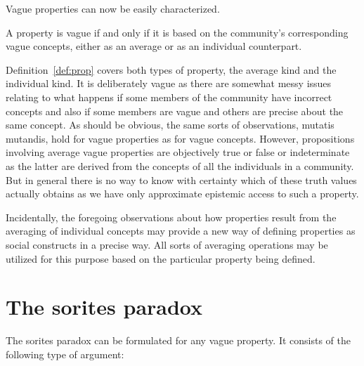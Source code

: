 
Vague properties can now be easily characterized.


\begin{definition}
A property is vague if and only if it is based on the community's corresponding vague concepts, either as an average or as an individual counterpart.
\label{def:prop}
\end{definition}

Definition~\ref{def:prop} covers both types of property, the average kind and the individual kind. It is deliberately vague as there are somewhat messy issues relating to what happens if some members of the community have incorrect concepts and also if some members are vague and others are precise about the same concept. As should be obvious, the same sorts of observations, mutatis mutandis, hold for vague properties as for vague concepts. However, propositions involving average vague properties are objectively true or false or indeterminate as the latter are derived from the concepts of all the individuals in a community. But in general there is no way to know with certainty which of these truth values actually obtains as we have only approximate epistemic access to such a property.

Incidentally, the foregoing observations about how properties result from the averaging of individual concepts may provide a new way of defining properties as social constructs in a precise way. All sorts of averaging operations may be utilized for this purpose based on the particular property being defined.


\section{The sorites paradox}

The sorites paradox can be formulated for any vague property. It consists of the following type of argument:

